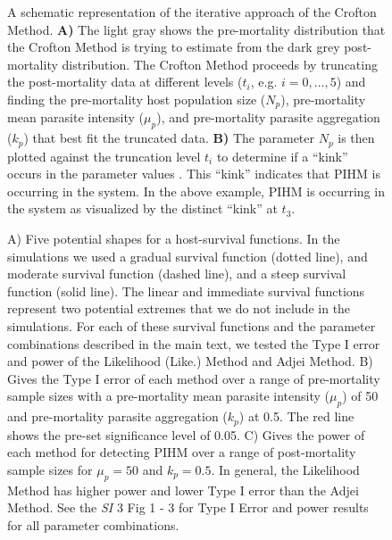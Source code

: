 \documentclass[12pt, a4paper]{article}
\begin{document}
\begin{figure}

    \captionsetup{justification=raggedright, singlelinecheck=false}

    \caption{A schematic representation of the iterative approach of the Crofton Method. \textbf{A)} The light gray shows the pre-mortality distribution that the Crofton Method is trying to estimate from the dark grey post-mortality distribution.  The Crofton Method proceeds by truncating the post-mortality data at different levels ($t_i$, e.g. $i= 0, \dots, 5$) and finding the pre-mortality host population size ($N_p$), pre-mortality mean parasite intensity ($\mu_p$), and pre-mortality parasite aggregation ($k_p$) that best fit the truncated data. \textbf{B)} The parameter $N_p$ is then plotted against the truncation level $t_i$ to determine if a ``kink'' occurs in the parameter values  \citep{Lester1984}. This ``kink'' indicates that PIHM is occurring in the system. In the above example, PIHM is occurring in the system as visualized by the distinct ``kink'' at $t_3$.}
    \label{fig:crofton}

\end{figure}

\begin{figure}

    \captionsetup{justification=raggedright, singlelinecheck=false}


    \caption{A) Five potential shapes for a host-survival functions. In the simulations we used a gradual survival function (dotted line), and moderate survival function (dashed line), and a steep survival function (solid line). The linear and immediate survival functions represent two potential extremes that we do not include in the simulations. For each of these survival functions and the parameter combinations described in the main text, we tested the Type I error and power of the Likelihood (Like.) Method and Adjei Method. B) Gives the Type I error of each method over a range of pre-mortality sample sizes with a pre-mortality mean parasite intensity ($\mu_p$) of 50 and pre-mortality parasite aggregation ($k_p$) at 0.5. The red line shows the pre-set significance level of 0.05. C) Gives the power of each method for detecting PIHM over a range of post-mortality sample sizes for $\mu_p = 50$ and $k_p = 0.5$.  In general, the Likelihood Method has higher power and lower Type I error than the Adjei Method.  See the \emph{SI} 3 Fig 1 - 3 for Type I Error and power results for all parameter combinations.}

\label{fig:question1}

\end{figure}
\end{document}
